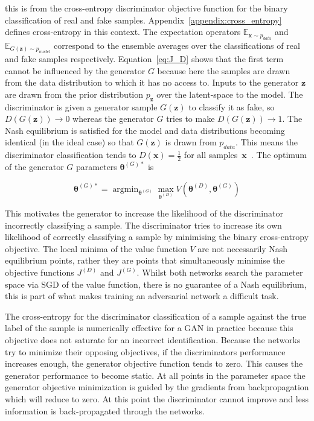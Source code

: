 \documentclass[twocolumn]{article}
\DeclareMathOperator*{\argmin}{\text{argmin}}
\numberwithin{equation}{section}
\begin{document}
this is from the cross-entropy discriminator objective function for the binary classification of real and fake samples. Appendix~\ref{appendix:cross_entropy} defines cross-entropy in this context. The expectation operators $\mathbb{E}_{\mathbf{x} \sim p_{data}}$ and $\mathbb{E}_{G(\mathbf{z}) \sim p_{model}}$ correspond to the ensemble averages over the classifications of real and fake samples respectively. Equation~\ref{eq:J_D} shows that the first term cannot be influenced by the generator $G$ because here the samples are drawn from the data distribution to which it has no access to. Inputs to the generator $\mathbf{z}$ are drawn from the prior distribution $p_\mathbf{z}$ over the latent-space to the model. The discriminator is given a generator sample $G(\mathbf{z})$ to classify it as fake, so $D(G(\mathbf{z})) \! \rightarrow \! 0$ whereas the generator $G$ tries to make $D(G(\mathbf{z})) \!  \rightarrow \! 1$. The Nash equilibrium is satisfied for the model and data distributions becoming identical (in the ideal case) so that $G(\mathbf{z})$ is drawn from $p_{data}$. This means the discriminator classification tends to $D(\mathbf{x}) = \frac{1}{2}$ for all samples~$\mathbf{x}$~\cite{gf_gan}. The optimum of the generator $G$ parameters $\bm{\theta}^{(G)*}$ is 

\begin{equation}
    \bm{\theta}^{(G)*} = \argmin_{\mathbf{\theta}^{(G)}}\max_{\mathbf{\theta}^{(D)}}V({\mathbf{\theta}^{(D)}},{\mathbf{\theta}^{(G)}})
\end{equation}

This motivates the generator to increase the likelihood of the discriminator incorrectly classifying a sample. The discriminator tries to increase its own likelihood of correctly classifying a sample by minimising the binary cross-entropy objective. The local minima of the value function $V$ are not necessarily Nash equilibrium points, rather they are points that simultaneously minimise the objective functions $J^{(D)}$ and $J^{(G)}$. Whilst both networks search the parameter space via SGD of the value function, there is no guarantee of a Nash equilibrium, this is part of what makes training an adversarial network a difficult task.

The cross-entropy for the discriminator classification of a sample against the true label of the sample is numerically effective for a GAN in practice because this objective does not saturate for an incorrect identification. Because the networks try to minimize their opposing objectives, if the discriminators performance increases enough, the generator objective function tends to zero. This causes the generator performance to become static. At all points in the parameter space the generator objective minimization is guided by the gradients from backpropagation which will reduce to zero. At this point the discriminator cannot improve and less information is back-propagated through the networks.
\end{document}
